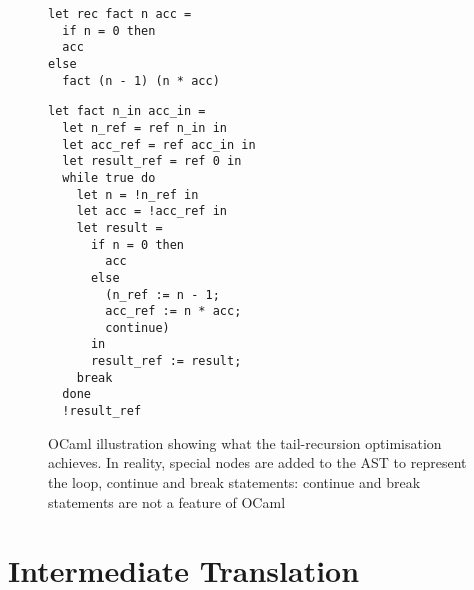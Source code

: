 \begin{figure}[h]
\begin{minipage}[t]{0.5\linewidth}
\begin{verbatim}
let rec fact n acc =
  if n = 0 then
  acc
else
  fact (n - 1) (n * acc)
\end{verbatim}
\end{minipage}
\begin{minipage}[t]{0.5\linewidth}
\begin{verbatim}
let fact n_in acc_in =
  let n_ref = ref n_in in
  let acc_ref = ref acc_in in
  let result_ref = ref 0 in
  while true do
    let n = !n_ref in
    let acc = !acc_ref in
    let result =
      if n = 0 then
        acc
      else
        (n_ref := n - 1;
        acc_ref := n * acc;
        continue)
      in
      result_ref := result;
    break
  done
  !result_ref
\end{verbatim}
\end{minipage}
\caption{OCaml illustration showing what the tail-recursion optimisation achieves. In reality, special nodes are added to the AST to represent the loop, continue and break statements: continue and break statements are not a feature of OCaml}
\label{fig:tailrec}
\end{figure}





\section{Intermediate Translation}

